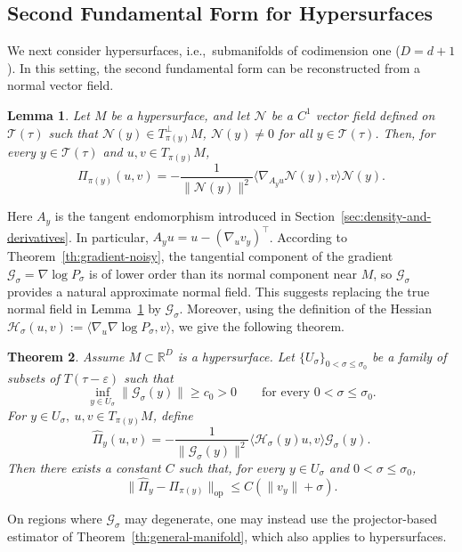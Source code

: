 \documentclass[11pt]{article}
\theoremstyle{plain}
\newtheorem{theorem}{Theorem}[section]
\newtheorem{lemma}[theorem]{Lemma}
\theoremstyle{definition}
\begin{document}
\subsection{Second Fundamental Form for Hypersurfaces}\label{sec:Pi-hypersurface construction}
We next consider hypersurfaces, i.e.,\ submanifolds of codimension one ($D =d+1$). In this setting, the second fundamental form can be reconstructed from a normal vector field. 
\begin{lemma}\label{lem:extended-normal-vector-field}
Let $M$ be a hypersurface, and let $\mathcal N$ be a $C^1$ vector field defined on $\mathcal T(\tau)$ such that $\mathcal N(y) \in T_{\pi(y)}^\perp M$, $\mathcal N(y)\ne 0$ for all $y\in \mathcal T(\tau)$. Then, for every $y\in\mathcal T(\tau)$ and $u,v\in T_{\pi(y)}M$,
\[
\Pi_{\pi(y)}(u,v) = -\frac{1}{\|\mathcal N(y)\|^2}\big\langle \nabla_{A_y u}\mathcal N(y), v \big\rangle \mathcal N(y).
\]
\end{lemma}
Here $A_y$ is the tangent endomorphism introduced in Section~\ref{sec:density-and-derivatives}. In particular, $A_yu = u - (\nabla_uv_y)^\top$.
According to Theorem~\ref{th:gradient-noisy}, the tangential component of the gradient
$\mathcal G_\sigma=\nabla\log P_\sigma$ is of lower order than its normal component near
$M$, so $\mathcal G_\sigma$ provides a natural approximate normal field. This suggests
replacing the true normal field in Lemma~\ref{lem:extended-normal-vector-field} by
$\mathcal G_\sigma$. Moreover, using the definition of the Hessian $\mathcal{H}_\sigma(u,v):=\langle\nabla_u \nabla \log P_\sigma, v\rangle$, we give the following theorem.
\begin{theorem}\label{th:hypersurface}
Assume $M\subset\mathbb{R}^D$ is a hypersurface. Let $\{U_\sigma\}_{0<\sigma\le\sigma_0}$ be a family of subsets of $T(\tau-\varepsilon)$ such that
\[
\inf_{y\in U_\sigma}\|\mathcal G_\sigma(y)\|\ge c_0>0
\qquad\text{for every }0<\sigma\le\sigma_0.
\]
For $y\in U_\sigma,\ u,v\in T_{\pi(y)}M$, define
\[
\widehat{\Pi}_y(u,v) = -\frac{1}{\|\mathcal G_\sigma(y)\|^2}\big\langle\mathcal{H}_\sigma(y)u, v\big\rangle \mathcal G_\sigma(y).
\]
Then there exists a constant $C$ such that, for every $y\in U_\sigma$ and $0<\sigma\le\sigma_0$,   
\[
\|\widehat{\Pi}_y-\Pi_{\pi(y)}\|_{\mathrm{op}} \le C(\|v_y\|+\sigma).
\]
\end{theorem}
On regions where $\mathcal G_\sigma$ may degenerate, one may instead use the projector-based estimator of Theorem~\ref{th:general-manifold}, which also applies to hypersurfaces.
\end{document}
